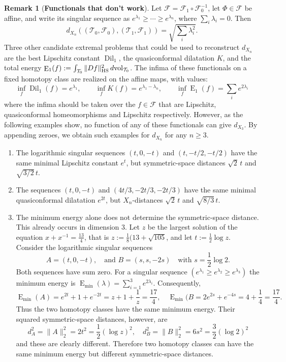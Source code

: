 \documentclass[11pt,letterpaper]{amsart}
\theoremstyle{definition}
\numberwithin{equation}{section}
\theoremstyle{definition}
\newtheorem{remark}[theorem]{Remark}
\newcommand{\Fc}{\mathcal{F}}
\newcommand{\Tc}{\mathcal{T}}
\newcommand{\Fcal}{\mathcal{F}}
\DeclareMathOperator{\En}{E}
\newcommand{\Dil}{\operatorname{Dil}}
\newcommand{\vol}{\operatorname{vol}}
\begin{document}
\begin{remark}[{\bf Functionals that don't work}] \label{remark:dontwork}
Let $\Fc=\Fc_1\circ\Fc_0^{-1}$, let $\Phi\in\Fc$ be affine, and write its
singular sequence as $e^{\lambda_1}\geq\cdots\geq e^{\lambda_n}$, where
$\sum_i\lambda_i=0$.  Then
\[
\textstyle d_{X_n}((\Tc_0,\Fc_0),(\Tc_1,\Fc_1))=\sqrt{\sum_i\lambda_i^2}.
\]
Three other candidate extremal problems that could be used to reconstruct $d_{X_n}$ are the best Lipschitz constant $\Dil_1$, the quasiconformal dilatation $K$, and the total energy $\En_1(f):=\int_{\Tc_0}\|Df\|_{\rm HS}^2\,d\!\vol_{\Tc_0}$.  The infima of these functionals on a fixed homotopy class are realized on the affine maps, with values: 
\[
\textstyle \inf_f \Dil_1(f)=e^{\lambda_1},\qquad
\inf_f K(f)=e^{\lambda_1-\lambda_n},\qquad
\inf_f \En_1(f)=\sum_i e^{2\lambda_i}
\]
where the infima should be taken over the $f\in \Fcal$ that are  Lipschitz, quasiconformal homeomorphisms and Lipschitz respectively.  However,  as the following examples show, no  function of any of these functionals can give $d_{X_3}$. 
By appending zeroes, we obtain such examples for $d_{X_n}$ for any  $n\ge 3$. 
\begin{enumerate}
\item The logarithmic
singular sequences $(t,0,-t)$ and $(t,-t/2,-t/2)$ have the same minimal Lipschitz constant $e^t$, but symmetric-space distances $\sqrt2\,t$ and $\sqrt{3/2}\,t$.  
\item The sequences $(t,0,-t)$ and $(4t/3,-2t/3,-2t/3)$
have the same minimal quasiconformal dilatation $e^{2t}$, but $X_n$-distances
$\sqrt2\,t$ and $\sqrt{8/3}\,t$.  

\item The minimum energy alone does not determine the symmetric-space
distance. This already occurs in dimension \(3\). Let $z$ be the largest solution of the equation $x+x^{-1}=\frac{13}{4}$,
that is $z:=\frac{1}{8}(13+\sqrt{105}$, and let $t:=\frac{1}{2}\log z$. Consider the 
logarithmic singular sequences 
\[
\textstyle  A=(t,0,-t), \quad \text{and } B=(s,s,-2s)\quad \text{with } s=\frac12\log 2.
\]  
Both sequences have sum zero. 
For a singular sequence $(e^{\lambda_1}\ge e^{\lambda_2}\ge e^{\lambda_3})$ the minimum energy is
$\En_{\min}(\lambda)=\sum_{i=1}^3 e^{2\lambda_i}$. Consequently,
\[
\textstyle   \En_{\min}(A) =e^{2t}+1+e^{-2t} =z+1+\frac1z =\frac{17}{4},\quad  \En_{\min}(B =2e^{2s}+e^{-4s} =4+\frac14 =\frac{17}{4}.
\]
Thus the two homotopy classes have the same minimum energy. Their
squared symmetric-space distances, however, are
\[
\textstyle    d_A^2 =\lVert A\rVert_2^2 =2t^2 =\frac12(\log z)^2,\quad d_B^2 =\lVert B\rVert_2^2 =6s^2 =\frac32(\log 2)^2
\]
and these are clearly different. Therefore two homotopy classes can have the same minimum energy but
different symmetric-space distances. 
\end{enumerate}
\end{remark}
\end{document}
